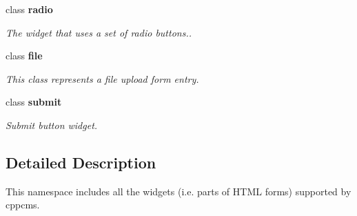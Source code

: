 \begin{DoxyCompactItemize}
class {\bf radio}
\begin{DoxyCompactList}\small\item\em \-The widget that uses a set of radio buttons.. \end{DoxyCompactList}\item 
class {\bf file}
\begin{DoxyCompactList}\small\item\em \-This class represents a file upload form entry. \end{DoxyCompactList}\item 
class {\bf submit}
\begin{DoxyCompactList}\small\item\em \-Submit button widget. \end{DoxyCompactList}\end{DoxyCompactItemize}


\subsection{\-Detailed \-Description}
\-This namespace includes all the widgets (i.\-e. parts of \-H\-T\-M\-L forms) supported by cppcms. 